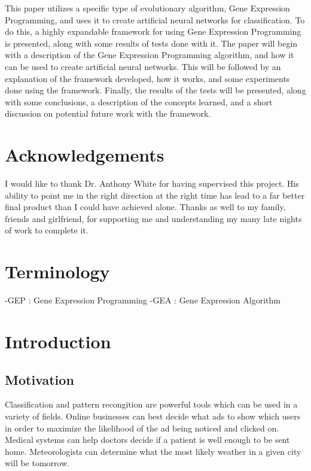 \documentclass[a4paper,11pt]{report}
\begin{document}
This paper utilizes a specific type of evolutionary algorithm, Gene Expression Programming,
and uses it to create artificial neural networks for classification. To do this, a highly expandable 
framework for using Gene Expression Programming is presented, along with some results of tests done 
with it. The paper will begin with a description of the Gene Expression Programming algorithm, and 
how it can be used to create artificial neural networks. This will be followed by an explanation 
of the framework developed, how it works, and some experiments done using the framework. Finally,
the results of the tests will be presented, along with some conclusions, a description of the 
concepts learned, and a short discussion on potential future work with the framework. 


\chapter*{Acknowledgements}
I would like to thank Dr. Anthony White for having supervised this project. His ability 
to point me in the right direction at the right time has lead to a far better final product than I 
could have achieved alone. Thanks as well to my family, friends and girlfriend, for supporting me and 
understanding my many late nights of work to complete it. 


\setcounter{tocdepth}{1}
\tableofcontents 

\chapter{Terminology}
-GEP : Gene Expression Programming
-GEA : Gene Expression Algorithm


\chapter{Introduction}

\section{Motivation}

Classification and pattern recongition are powerful tools which can be used in a variety of 
fields. Online businesses can best decide what ads to show which users in order to maximize
the likelihood of the ad being noticed and clicked on. Medical systems can help doctors 
decide if a patient is well enough to be sent home. Meteorologists can determine what the 
most likely weather in a given city will be tomorrow. 
\end{document}
